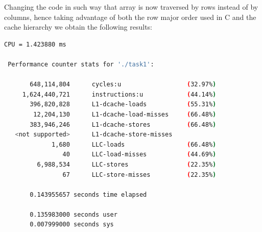 \documentclass[11pt,a4paper]{article}
\begin{document}
Changing the code in such way that array is now traversed by rows
instead of by columns, hence taking advantage of both the row major order used in C and the cache hierarchy we obtain the following results:
\begin{lstlisting}[language=bash]
CPU = 1.423880 ms 

 Performance counter stats for './task1':

       648,114,804      cycles:u                  (32.97%)
     1,624,440,721      instructions:u            (44.14%)
       396,820,828      L1-dcache-loads           (55.31%)
        12,204,130      L1-dcache-load-misses     (66.48%)
       383,946,246      L1-dcache-stores          (66.48%)
   <not supported>      L1-dcache-store-misses                                      
             1,680      LLC-loads                 (66.48%)
                40      LLC-load-misses           (44.69%)
         6,988,534      LLC-stores                (22.35%)
                67      LLC-store-misses          (22.35%)

       0.143955657 seconds time elapsed

       0.135983000 seconds user
       0.007999000 seconds sys
\end{lstlisting}
\end{document}
